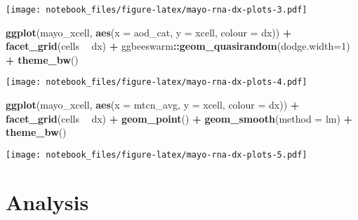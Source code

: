 \documentclass[]{book}
\newenvironment{Shaded}{\begin{snugshade}}{\end{snugshade}}
\newcommand{\DataTypeTok}[1]{\textcolor[rgb]{0.13,0.29,0.53}{#1}}
\newcommand{\DecValTok}[1]{\textcolor[rgb]{0.00,0.00,0.81}{#1}}
\newcommand{\KeywordTok}[1]{\textcolor[rgb]{0.13,0.29,0.53}{\textbf{#1}}}
\newcommand{\NormalTok}[1]{#1}
\newcommand{\OperatorTok}[1]{\textcolor[rgb]{0.81,0.36,0.00}{\textbf{#1}}}
\newcommand{\StringTok}[1]{\textcolor[rgb]{0.31,0.60,0.02}{#1}}
\begin{document}
\texttt{[image: notebook\_files/figure-latex/mayo-rna-dx-plots-3.pdf]}

\begin{Shaded}
\begin{Highlighting}[]
\KeywordTok{ggplot}\NormalTok{(mayo_xcell, }\KeywordTok{aes}\NormalTok{(}\DataTypeTok{x =}\NormalTok{ aod_cat, }\DataTypeTok{y =}\NormalTok{ xcell, }\DataTypeTok{colour =}\NormalTok{ dx)) }\OperatorTok{+}\StringTok{ }
\StringTok{  }\KeywordTok{facet_grid}\NormalTok{(cells }\OperatorTok{~}\StringTok{ }\NormalTok{dx) }\OperatorTok{+}
\StringTok{  }\NormalTok{ggbeeswarm}\OperatorTok{::}\KeywordTok{geom_quasirandom}\NormalTok{(}\DataTypeTok{dodge.width=}\DecValTok{1}\NormalTok{) }\OperatorTok{+}\StringTok{ }
\StringTok{  }\KeywordTok{theme_bw}\NormalTok{()}
\end{Highlighting}
\end{Shaded}

\texttt{[image: notebook\_files/figure-latex/mayo-rna-dx-plots-4.pdf]}

\begin{Shaded}
\begin{Highlighting}[]
\KeywordTok{ggplot}\NormalTok{(mayo_xcell, }\KeywordTok{aes}\NormalTok{(}\DataTypeTok{x =}\NormalTok{ mtcn_avg, }\DataTypeTok{y =}\NormalTok{ xcell, }\DataTypeTok{colour =}\NormalTok{ dx)) }\OperatorTok{+}\StringTok{ }
\StringTok{  }\KeywordTok{facet_grid}\NormalTok{(cells }\OperatorTok{~}\StringTok{ }\NormalTok{dx) }\OperatorTok{+}
\StringTok{  }\KeywordTok{geom_point}\NormalTok{() }\OperatorTok{+}\StringTok{ }
\StringTok{  }\KeywordTok{geom_smooth}\NormalTok{(}\DataTypeTok{method =}\NormalTok{ lm) }\OperatorTok{+}\StringTok{ }
\StringTok{  }\KeywordTok{theme_bw}\NormalTok{()}
\end{Highlighting}
\end{Shaded}

\texttt{[image: notebook\_files/figure-latex/mayo-rna-dx-plots-5.pdf]}

\hypertarget{analysis}{%
\chapter{Analysis}\label{analysis}}
\end{document}
